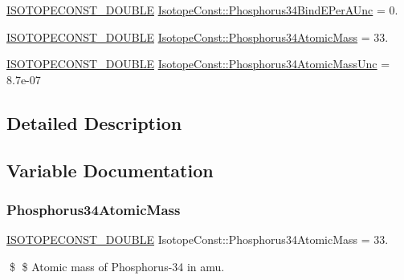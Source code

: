 \begin{DoxyCompactItemize}
\mbox{\hyperlink{group___isotope_const-_macros_ga8f45a7272ce02c0b4c65c44636ed719a}{I\+S\+O\+T\+O\+P\+E\+C\+O\+N\+S\+T\+\_\+\+D\+O\+U\+B\+LE}} \mbox{\hyperlink{group___isotope_const-_phosphorus-_p34_gaf883d4ffb6a02b1ffe6dd7ba01fb5412}{Isotope\+Const\+::\+Phosphorus34\+Bind\+E\+Per\+A\+Unc}} = 0.
\item 
\mbox{\hyperlink{group___isotope_const-_macros_ga8f45a7272ce02c0b4c65c44636ed719a}{I\+S\+O\+T\+O\+P\+E\+C\+O\+N\+S\+T\+\_\+\+D\+O\+U\+B\+LE}} \mbox{\hyperlink{group___isotope_const-_phosphorus-_p34_ga467033a4368899a0eeaa39a8703360bd}{Isotope\+Const\+::\+Phosphorus34\+Atomic\+Mass}} = 33.
\item 
\mbox{\hyperlink{group___isotope_const-_macros_ga8f45a7272ce02c0b4c65c44636ed719a}{I\+S\+O\+T\+O\+P\+E\+C\+O\+N\+S\+T\+\_\+\+D\+O\+U\+B\+LE}} \mbox{\hyperlink{group___isotope_const-_phosphorus-_p34_ga514e9b4cf1253fca47df8f1613094f97}{Isotope\+Const\+::\+Phosphorus34\+Atomic\+Mass\+Unc}} = 8.\+7e-\/07
\end{DoxyCompactItemize}


\subsection{Detailed Description}


\subsection{Variable Documentation}
\mbox{\label{group___isotope_const-_phosphorus-_p34_ga467033a4368899a0eeaa39a8703360bd}} 
\subsubsection{\texorpdfstring{Phosphorus34\+Atomic\+Mass}{Phosphorus34AtomicMass}}
{\footnotesize\ttfamily \mbox{\hyperlink{group___isotope_const-_macros_ga8f45a7272ce02c0b4c65c44636ed719a}{I\+S\+O\+T\+O\+P\+E\+C\+O\+N\+S\+T\+\_\+\+D\+O\+U\+B\+LE}} Isotope\+Const\+::\+Phosphorus34\+Atomic\+Mass = 33.}

\$ \$ Atomic mass of Phosphorus-\/34 in amu. \mbox{\label{group___isotope_const-_phosphorus-_p34_ga514e9b4cf1253fca47df8f1613094f97}} 
